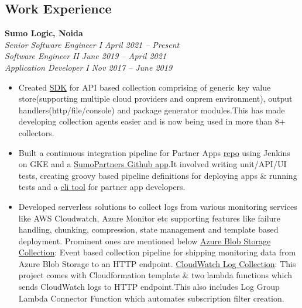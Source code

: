 \documentclass[margin,line]{resume}
\begin{document}
\begin{resume}
    \section{\mysidestyle Work Experience}
    \textbf{Sumo Logic, Noida}\\
        \textsl{Senior Software Engineer I} \hfill \textsl{April 2021 -- Present}\vspace{0mm}\\\vspace{0mm}%
        \textsl{Software Engineer II} \hfill \textsl{June 2019 -- April 2021}\vspace{0mm}\\\vspace{0mm}%
        \textsl{Application Developer I} \hfill \textsl{Nov 2017 -- June 2019}\vspace{1mm}%
        \begin{itemize}
            \item Created \href{https://pypi.org/project/sumologic-appclient-sdk/}{SDK} for API based collection comprising of generic key value store(supporting multiple cloud providers and onprem environment), output handlers(http/file/console) and package generator modules.This has made developing collection agents easier and is now being used in more than 8+ collectors.
            \item Built a continuous integration pipeline for Partner Apps \href{https://github.com/SumoLogic/sumologic-public-partner-apps}{repo} using Jenkins on GKE and a  \href{https://github.com/apps/sumopartners}{SumoPartners Github app}.It involved writing unit/API/UI tests, creating groovy based pipeline definitions for deploying apps \& running tests and a \href{https://github.com/SumoLogic/sumologic-appcli-core}{cli tool} for partner app developers.
            \item Developed serverless solutions to collect logs from various monitoring services like AWS Cloudwatch, Azure Monitor etc supporting features like failure handling, chunking, compression, state management and template based deployment. Prominent ones are mentioned below 
            \subitem \href{https://help.sumologic.com/Send-Data/Collect-from-Other-Data-Sources/Azure_Blob_Storage}{Azure Blob Storage Collection}: Event based collection pipeline for shipping monitoring
data from Azure Blob Storage to an HTTP endpoint.
            \subitem \href{https://help.sumologic.com/Send-Data/Collect-from-Other-Data-Sources/Amazon-CloudWatch-Logs}{CloudWatch Log Collection}: This project comes with Cloudformation template \& two lambda functions which sends CloudWatch logs to HTTP endpoint.This also includes Log Group Lambda Connector Function which automates subscription filter creation.

\end{itemize}
\end{resume}
\end{document}
